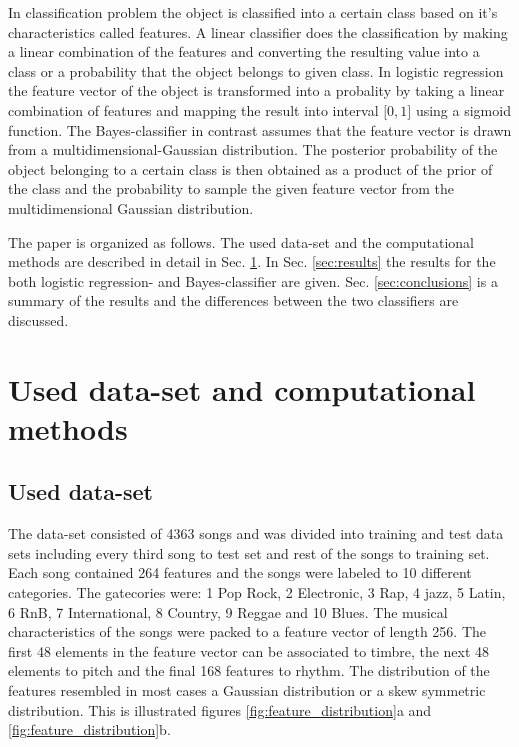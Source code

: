 \documentclass[aps,prb,10pt,twocolumn,groupedaddress]{revtex4-1}
\begin{document}
In classification problem the object is classified into a certain class based
on it's characteristics called features. A linear classifier does the
classification by making a linear combination of the features and converting
the resulting value into a class or a probability that the object belongs to
given class. In logistic regression the feature vector of the object is
transformed into a probality by taking a linear combination of features and
mapping the result into interval $\lbrack 0, 1\rbrack$ using a sigmoid function.
The Bayes-classifier in contrast assumes that the feature vector is drawn from a
multidimensional-Gaussian distribution. The posterior probability of the object
belonging to a certain class is then obtained as a product of the prior of the
class and the probability to sample the given feature vector from the
multidimensional Gaussian distribution.

The paper is organized as follows. The used data-set and the computational
methods are described in detail in Sec. \ref{sec:methods}. In Sec.
\ref{sec:results} the results for the both logistic regression- and
Bayes-classifier are given. Sec. \ref{sec:conclusions} is a
summary of the results and the differences between the two classifiers are
discussed.

\section{Used data-set and computational methods}
\label{sec:methods}
\subsection{Used data-set}
\label{sec:used_data_set}
The data-set consisted of 4363 songs and was divided into training and test data
sets including every third song to test set and rest of the songs to training
set. Each song contained 264 features and the songs were labeled to 10
different categories. The gatecories were: 1 Pop Rock, 2 Electronic, 3 Rap,
4 jazz, 5 Latin, 6 RnB, 7 International, 8 Country, 9 Reggae and 10 Blues.
The musical characteristics of the songs were packed to a feature
vector of length 256. The first 48 elements in the feature vector can be
associated to timbre, the next 48 elements to pitch and the final 168 features
to rhythm. The distribution of the features resembled in most cases a Gaussian
distribution or a skew symmetric distribution. This is illustrated figures
\ref{fig:feature_distribution}a and \ref{fig:feature_distribution}b.
\end{document}
